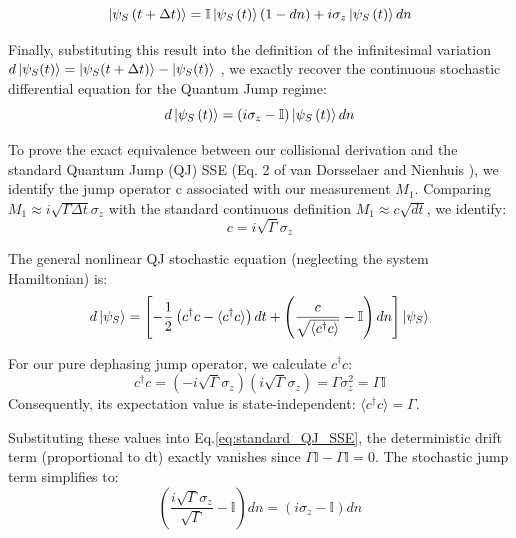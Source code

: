 \documentclass[a4paper,12pt]{article}
\begin{document}
\begin{equation}
	\ket{\psi_{S}\left(t + \Delta t \right)} = \mathbb{I} \ket{\psi_{S}\left(t\right)} \left(1 - dn\right) + i \sigma_{z} \ket{\psi_{S}\left(t\right)} dn
\end{equation}

Finally, substituting this result into the definition of the infinitesimal variation 
$ d\ket{\psi_{S}(t)} = \ket{\psi_{S}(t + \Delta t)} - \ket{\psi_{S}(t)}$ , we exactly recover 
the continuous stochastic differential equation for the Quantum Jump regime:
\begin{equation}
	d\ket{\psi_{S}\left(t\right)} = \left( i\sigma_{z} - \mathbb{I} \right) \ket{\psi_{S}\left(t\right)} dn
\end{equation}

To prove the exact equivalence between our collisional derivation and the standard 
Quantum Jump (QJ) SSE (Eq. 2 of van Dorsselaer and Nienhuis \cite{vandorsselaerQuantumTrajectoriesGeneralized}), we identify the 
jump operator c associated with our measurement $M_1$. 
Comparing $M_1 \approx i \sqrt{\Gamma \Delta t} \sigma_z$ with the standard continuous 
definition $M_1 \approx c \sqrt{dt}$, we identify:
\begin{equation}
	c = i\sqrt{\Gamma}\sigma_{z}
\end{equation}

The general nonlinear QJ stochastic equation (neglecting the system Hamiltonian) is:
\begin{equation}
	d\ket{\psi_{S}} = \left[ -\frac{1}{2}\left(c^\dagger c - \langle c^\dagger c \rangle\right)dt + \left( \frac{c}{\sqrt{\langle c^\dagger c \rangle}} - \mathbb{I} \right)dn \right] \ket{\psi_{S}}
	\label{eq:standard_QJ_SSE}
\end{equation}

For our pure dephasing jump operator, we calculate $c^\dagger c$:
\begin{equation}
	c^\dagger c = (-i\sqrt{\Gamma}\sigma_{z})(i\sqrt{\Gamma}\sigma_{z}) = \Gamma\sigma_{z}^{2} = \Gamma\mathbb{I}
\end{equation}
Consequently, its expectation value is state-independent: $\langle c^\dagger c \rangle = \Gamma$.

Substituting these values into Eq.\ref{eq:standard_QJ_SSE}, the deterministic drift 
term (proportional to dt) exactly vanishes since $\Gamma\mathbb{I} - \Gamma\mathbb{I} = 0$.
The stochastic jump term simplifies to:
\begin{equation}
	\left( \frac{i\sqrt{\Gamma}\sigma_{z}}{\sqrt{\Gamma}} - \mathbb{I} \right)dn = (i\sigma_{z} - \mathbb{I})dn
\end{equation}
\end{document}
